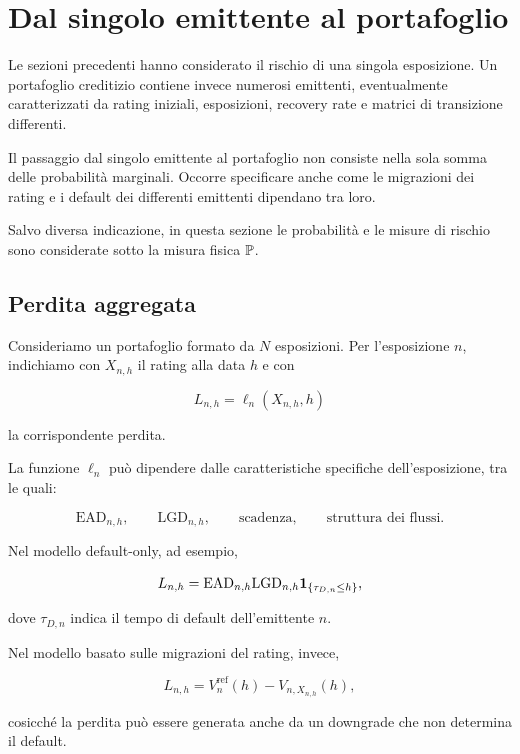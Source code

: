 \section{Dal singolo emittente al portafoglio}

\label{sec:cap9-portafoglio}

Le sezioni precedenti hanno considerato il rischio di una singola
esposizione. Un portafoglio creditizio contiene invece numerosi
emittenti, eventualmente caratterizzati da rating iniziali,
esposizioni, recovery rate e matrici di transizione differenti.

Il passaggio dal singolo emittente al portafoglio non consiste nella
sola somma delle probabilit\`{a} marginali. Occorre specificare anche
come le migrazioni dei rating e i default dei differenti emittenti
dipendano tra loro.

Salvo diversa indicazione, in questa sezione le probabilit\`{a} e le
misure di rischio sono considerate sotto la misura fisica $\mathbb{P}$.

\subsection{Perdita aggregata}

\label{subsec:cap9-perdita-portafoglio}

Consideriamo un portafoglio formato da $N$ esposizioni. Per
l'esposizione $n$, indichiamo con $X_{n,h}$ il rating alla data $h$ e
con

\[
L_{n,h}
=
\ell_n(X_{n,h},h)
\]

la corrispondente perdita.

La funzione $\ell_n$ pu\`{o} dipendere dalle caratteristiche
specifiche dell'esposizione, tra le quali:

\[
\mathrm{EAD}_{n,h},
\qquad
\mathrm{LGD}_{n,h},
\qquad
\text{scadenza},
\qquad
\text{struttura dei flussi}.
\]

Nel modello default-only, ad esempio,

\[
L_{n,h}
=
\mathrm{EAD}_{n,h}
\mathrm{LGD}_{n,h}
\mathbf{1}_{\{\tau_{D,n}\leq h\}},
\]

dove $\tau_{D,n}$ indica il tempo di default dell'emittente $n$.

Nel modello basato sulle migrazioni del rating, invece,

\[
L_{n,h}
=
V_n^{\mathrm{ref}}(h)
-
V_{n,X_{n,h}}(h),
\]

cosicch\'{e} la perdita pu\`{o} essere generata anche da un downgrade
che non determina il default.

